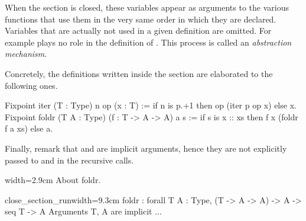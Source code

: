 When
the section is closed, these variables appear as arguments to
the various functions that use them in the very same
order in which they are declared.  
Variables that are actually
not used in a given definition are omitted. For example  plays no
role in the definition of .
This process %
is called
an {\em abstraction mechanism}.

Concretely, the definitions written inside the section are 
elaborated to the following ones.

\begin{coq}{}{}
Fixpoint iter (T : Type) n op (x : T) :=
  if n is p.+1 then op (iter p op x) else x.
Fixpoint foldr (T A : Type) (f : T -> A -> A) a s :=
  if s is x :: xs then f x (foldr f a xs) else a.
\end{coq}

Finally, remark that  and  are implicit arguments, hence they
are not explicitly passed to  and  in the recursive calls.

\begin{coq}{}{width=2.9cm}
About foldr.
$~$
\end{coq}
\begin{coqout}{close_section_run}{width=9.3cm}
foldr : forall T A : Type, (T -> A -> A) -> A -> seq T -> A
Arguments T, A are implicit ...
\end{coqout}


